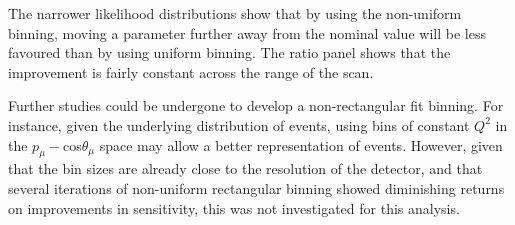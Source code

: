 The narrower likelihood distributions show that by using the non-uniform binning, moving a parameter further away from the nominal value will be less favoured than by using uniform binning. The ratio panel shows that the improvement is fairly constant across the range of the scan.

Further studies could be undergone to develop a non-rectangular fit binning. For instance, given the underlying distribution of events, using bins of constant $Q^2$ in the $p_{\mu}-$cos$\theta_{\mu}$ space may allow a better representation of events. However, given that the bin sizes are already close to the resolution of the detector, and that several iterations of non-uniform rectangular binning showed diminishing returns on improvements in sensitivity, this was not investigated for this analysis.

